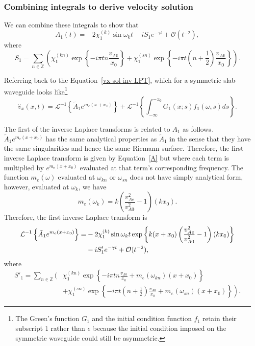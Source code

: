 \documentclass[12pt]{../style-files/ociamthesis}
\begin{document}
\subsubsection{Combining integrals to derive velocity solution}
We can combine these integrals to show that
\begin{equation}
A_1(t) = -2\chi_1^{(k)}\sin{\omega_k t} - iS_1 e^{-\gamma t} + \mathcal{O}(t^{-2}),
\label{A}
\end{equation}
where
\begin{equation}
S_1 = \sum_{n \in \mathbb{Z}} \left( \chi_1^{(kn)}\exp\left\{-i\pi t n \frac{v_{A0}}{x_0}\right\} + \chi_1^{(sn)}\exp\left\{-i\pi t \left(n+\frac{1}{2}\right) \frac{v_{A0}}{x_0}\right\} \right).
\end{equation}

Referring back to the Equation~\eqref{vx sol inv LPT}, which for a symmetric slab waveguide looks like\footnote{The Green's function $G_1$ and the initial condition function $f_1$ retain their subscript $1$ rather than $e$ because the initial condition imposed on the symmetric waveguide could still be asymmetric.}
\begin{equation}
\hat{v}_x(x, t) = \mathcal{L}^{-1} \left\{ \tilde{A}_1 e^{m_e(x + x_0)} \right\} + \mathcal{L}^{-1} \left\{ \int_{-\infty}^{-x_0} G_1(x; s)f_1(\omega, s)ds \right\}.
\label{vx sol inv LPT sym}
\end{equation}

The first of the inverse Laplace transforms is related to $A_1$ as follows. $\tilde{A}_1e^{m_e(x + x_0)}$ has the same analytical properties as $\tilde{A}_1$ in the sense that they have the same singularities and hence the same Riemann surface. Therefore, the first inverse Laplace transform is given by Equation~\eqref{A} but where each term is multiplied by $e^{m_e(x + x_0)}$ evaluated at that term's corresponding frequency. The function $m_e(\omega)$ evaluated at $\omega_{kn}$ or $\omega_{sn}$ does not have simply analytical form, however, evaluated at $\omega_k$, we have
\begin{equation}
m_e(\omega_k) = k\left( \frac{v_{Ae}^2}{v_{A0}^2} - 1 \right) (kx_0).
\end{equation}
Therefore, the first inverse Laplace transform is
\begin{align}
\mathcal{L}^{-1} \left\{ \tilde{A}_1 e^{m_e(x + x_0)} \right\} = &-2\chi_1^{(k)}\sin{\omega_k t}\exp\left\{ k(x + x_0)\left( \frac{v_{Ae}^2}{v_{A0}^2} - 1 \right) (kx_0) \right\} \notag \\
&- iS'_1 e^{-\gamma t} + \mathcal{O}(t^{-2}),
\end{align}
where
\begin{align}
S'_1 = \sum_{n \in \mathbb{Z}} \bigg( & \chi_1^{(kn)}\exp\left\{-i\pi t n \frac{v_{A0}}{x_0} + m_e(\omega_{kn})(x + x_0) \right\} \\
&\left.+ \chi_1^{(sn)}\exp\left\{-i\pi t \left(n+\frac{1}{2}\right) \frac{v_{A0}}{x_0} + m_e(\omega_{sn})(x + x_0)\right\} \right).
\end{align}
\end{document}
